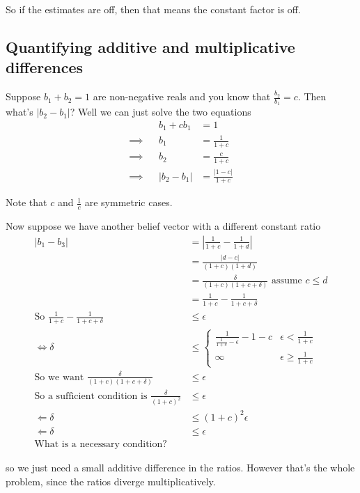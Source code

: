 \documentclass[10pt,english]{article}
\begin{document}
So if the estimates are off, then that means the constant factor is off.

\subsection{Quantifying additive and multiplicative differences}

Suppose $b_1 + b_2 = 1$ are non-negative reals and you know that $\frac{b_2}{b_1} = c$. Then what's $|b_2 - b_1|$? Well we can just solve the two equations
\begin{align}
& & b_1 + cb_1 &= 1 \\
\implies & & b_1 &= \frac{1}{1+c} \\
\implies & & b_2 &= \frac{c}{1+c} \\
\implies & & |b_2 - b_1 |  &= \frac{|1-c|}{1+c}
\end{align}

Note that $c$ and $\frac{1}{c}$ are symmetric cases.

Now suppose we have another belief vector with a different constant ratio
\begin{align}
|b_1 - b_3| &= \left| \frac{1}{1+c} - \frac{1}{1+d}\right| \\
&= \frac{|d-c|}{(1+c)(1+d)} \\
&= \frac{\delta}{(1+c)(1+c+\delta)} \text{ assume $c \leq d$}\\
&= \frac{1}{1+c} - \frac{1}{1+c+\delta}\\
\text{So } \frac{1}{1+c} - \frac{1}{1+c+\delta} &\leq \epsilon\\
\iff \delta &\leq \begin{cases}
\frac{1}{\frac{1}{1+c}-\epsilon} - 1 - c & \epsilon < \frac{1}{1+c}\\
\infty & \epsilon \geq \frac{1}{1+c}
\end{cases}\\
\text{So we want }  \frac{\delta}{(1+c)(1+c+\delta)} &\leq \epsilon\\
\text{So a sufficient condition is } \frac{\delta}{(1+c)^2} &\leq \epsilon\\
\Longleftarrow \delta &\leq (1+c)^2 \epsilon \\
\Longleftarrow \delta &\leq \epsilon\\
\text{What is a necessary condition?}
\end{align}

so we just need a small additive difference in the ratios. However that's the whole problem, since the ratios diverge multiplicatively.
\end{document}
